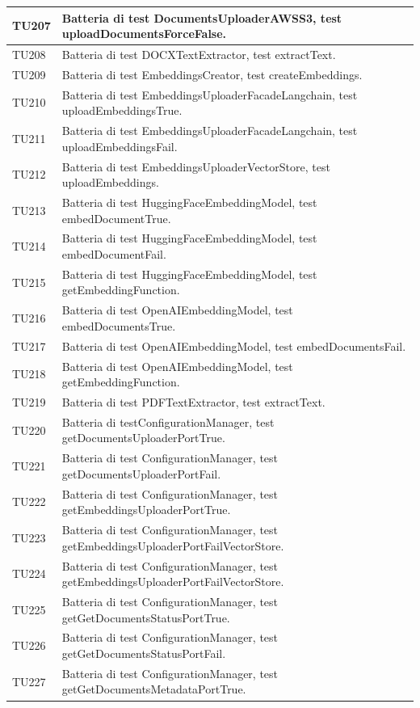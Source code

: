 \documentclass[10pt, a4paper]{article}
\begin{document}
\begin{xltabular}{\textwidth}{p{0.12\textwidth}|X}
\hline
TU207 & Batteria di test DocumentsUploaderAWSS3, test uploadDocumentsForceFalse. \\
\hline
TU208 & Batteria di test DOCXTextExtractor, test extractText. \\
\hline
TU209 & Batteria di test EmbeddingsCreator, test createEmbeddings. \\
\hline
TU210 & Batteria di test EmbeddingsUploaderFacadeLangchain, test uploadEmbeddingsTrue. \\
\hline
TU211 & Batteria di test EmbeddingsUploaderFacadeLangchain, test uploadEmbeddingsFail. \\
\hline
TU212 & Batteria di test EmbeddingsUploaderVectorStore, test uploadEmbeddings. \\
\hline
TU213 & Batteria di test HuggingFaceEmbeddingModel, test embedDocumentTrue. \\
\hline
TU214 & Batteria di test HuggingFaceEmbeddingModel, test embedDocumentFail. \\
\hline
TU215 & Batteria di test HuggingFaceEmbeddingModel, test getEmbeddingFunction. \\
\hline
TU216 & Batteria di test OpenAIEmbeddingModel, test embedDocumentsTrue. \\
\hline
TU217 & Batteria di test OpenAIEmbeddingModel, test embedDocumentsFail. \\
\hline
TU218 & Batteria di test OpenAIEmbeddingModel, test getEmbeddingFunction. \\
\hline
TU219 & Batteria di test PDFTextExtractor, test extractText. \\
\hline
TU220 & Batteria di testConfigurationManager, test getDocumentsUploaderPortTrue. \\
\hline
TU221 & Batteria di test ConfigurationManager, test getDocumentsUploaderPortFail. \\
\hline
TU222 & Batteria di test ConfigurationManager, test getEmbeddingsUploaderPortTrue. \\
\hline
TU223 & Batteria di test ConfigurationManager, test getEmbeddingsUploaderPortFailVectorStore. \\
\hline
TU224 & Batteria di test ConfigurationManager, test getEmbeddingsUploaderPortFailVectorStore. \\
\hline
TU225 & Batteria di test ConfigurationManager, test getGetDocumentsStatusPortTrue. \\
\hline
TU226 & Batteria di test ConfigurationManager, test getGetDocumentsStatusPortFail. \\
\hline
TU227 & Batteria di test ConfigurationManager, test getGetDocumentsMetadataPortTrue. \\

\end{xltabular}
\end{document}
